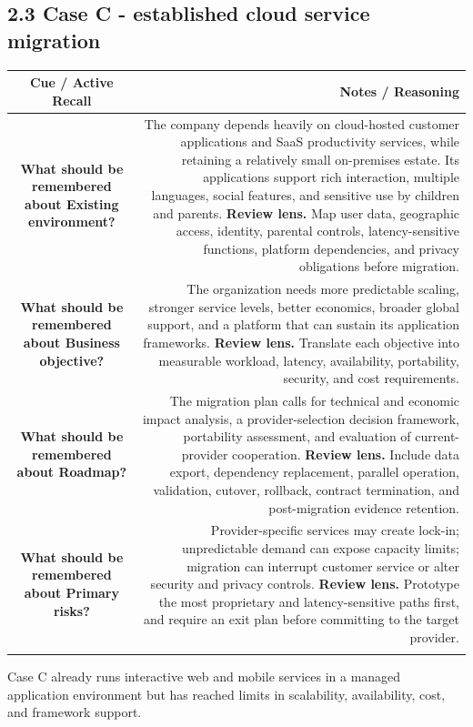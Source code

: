 \documentclass[11pt]{article}
\newcommand{\CornellHeader}{\rowcolor{Navy}\color{white}\bfseries Cue / Active Recall & \color{white}\bfseries Notes / Reasoning \\\endhead}
\newcommand{\CornellRow}[2]{\cellcolor{CueGray}\textbf{#1} & #2 \\\addlinespace[3pt]}
\begin{document}
\subsection{2.3 Case C - established cloud service migration}
\begin{longtable}{@{}C N@{}}
\CornellHeader
\CornellRow{What should be remembered about Existing environment?}{The company depends heavily on cloud-hosted customer applications and SaaS productivity services, while retaining a relatively small on-premises estate. Its applications support rich interaction, multiple languages, social features, and sensitive use by children and parents. \textbf{Review lens.} Map user data, geographic access, identity, parental controls, latency-sensitive functions, platform dependencies, and privacy obligations before migration.}
\CornellRow{What should be remembered about Business objective?}{The organization needs more predictable scaling, stronger service levels, better economics, broader global support, and a platform that can sustain its application frameworks. \textbf{Review lens.} Translate each objective into measurable workload, latency, availability, portability, security, and cost requirements.}
\CornellRow{What should be remembered about Roadmap?}{The migration plan calls for technical and economic impact analysis, a provider-selection decision framework, portability assessment, and evaluation of current-provider cooperation. \textbf{Review lens.} Include data export, dependency replacement, parallel operation, validation, cutover, rollback, contract termination, and post-migration evidence retention.}
\CornellRow{What should be remembered about Primary risks?}{Provider-specific services may create lock-in; unpredictable demand can expose capacity limits; migration can interrupt customer service or alter security and privacy controls. \textbf{Review lens.} Prototype the most proprietary and latency-sensitive paths first, and require an exit plan before committing to the target provider.}
\end{longtable}
\begin{sectionsummarybox}
Case C already runs interactive web and mobile services in a managed application environment but has reached limits in scalability, availability, cost, and framework support.
\end{sectionsummarybox}
\end{document}
